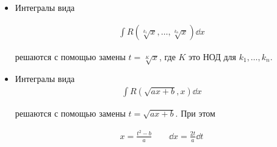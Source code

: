 \begin{itemize}
\item Интегралы вида

\begin{align*}
  \int R(\sqrt[k_{1}]{x}, \dots, \sqrt[k_{n}]{x}) \dd x
\end{align*}

решаются с помощью замены \(t = \sqrt[K]{x}\), где \(K\) это НОД для
\(k_{1}, \dotsc, k_{n}\).

\item Интегралы вида
\begin{align*}
  \int R(\sqrt{ax + b}, x) \dd x
\end{align*}

решаются с помощью замены \(t = \sqrt{ax + b}\). При этом

\begin{align*}
  x = \frac{t^2 - b}{a} \qquad \dd x = \frac{2t}{a} \dd t
\end{align*}
\end{itemize}
